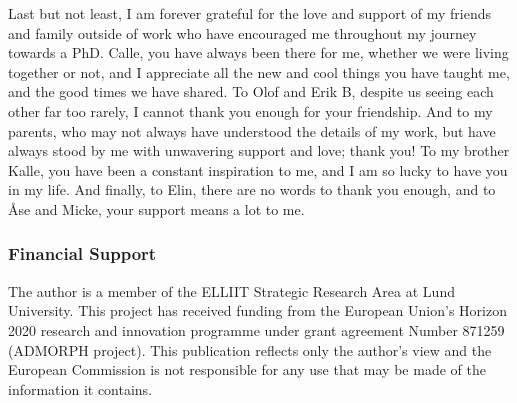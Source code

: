 Last but not least, I am forever grateful for the love and support of my friends and family outside of work who have encouraged me throughout my journey towards a PhD.
Calle, you have always been there for me, whether we were living together or not, and I appreciate all the new and cool things you have taught me, and the good times we have shared.
To Olof and Erik B, despite us seeing each other far too rarely, I cannot thank you enough for your friendship.
And to my parents, who may not always have understood the details of my work, but have always stood by me with unwavering support and love; thank you!
To my brother Kalle, you have been a constant inspiration to me, and I am so lucky to have you in my life.
And finally, to Elin, there are no words to thank you enough, and to {\AA}se and Micke, your support means a lot to me.

\subsubsection*{Financial Support}
The author is a member of the ELLIIT Strategic Research Area at Lund University.
This project has received funding from the European Union's Horizon 2020 research and innovation programme under grant agreement Number 871259 (ADMORPH project).
This publication reflects only the author's view and the European Commission is not responsible for any use that may be made of the information it contains.
